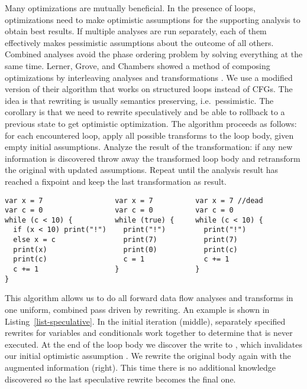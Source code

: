 Many optimizations are mutually beneficial.  In the presence of loops,
optimizations need to make optimistic assumptions for the supporting analysis
to obtain best results.  If multiple analyses are run separately, each of them
effectively makes pessimistic assumptions about the outcome of all others.
Combined analyses avoid the phase ordering problem by solving everything at the
same time. Lerner, Grove, and Chambers showed a method of composing
optimizations by interleaving analyses and transformations
\cite{lerner02composingdataflow}.  We use a modified version of their algorithm that
works on structured loops instead of CFGs. The idea is that rewriting is
usually semantics preserving, i.e.\ pessimistic.  The corollary is that we need
to rewrite speculatively and be able to rollback to a previous state to get
optimistic optimization. The algorithm proceeds as follows: for each
encountered loop, apply all possible transforms to the loop body, given empty
initial assumptions.  Analyze the result of the transformation: if any new
information is discovered throw away the transformed loop body and retransform
the original with updated assumptions.  Repeat until the analysis result has
reached a fixpoint and keep the last transformation as result.


\begin{lstlisting}[name=Code, caption={Speculative rewriting: initial optimistic
iteration (middle), fixpoint (right) reached after second iteration}, captionpos=b, 
label=list-speculative, float=t]
var x = 7                 var x = 7          var x = 7 //dead
var c = 0                 var c = 0          var c = 0
while (c < 10) {          while (true) {     while (c < 10) {
  if (x < 10) print("!")    print("!")         print("!")
  else x = c                print(7)           print(7)
  print(x)                  print(0)           print(c)
  print(c)                  c = 1              c += 1
  c += 1                  }                  }
}
\end{lstlisting}
This algorithm allows us to do all forward data flow analyses and transforms in
one uniform, combined pass driven by rewriting. An example is shown in
Listing~\ref{list-speculative}.  In the initial iteration (middle), separately
specified rewrites for variables and conditionals work together to 
determine that  is never executed. At the end of the loop body we
discover the write to , which invalidates our initial optimistic
assumption .  We rewrite the original body again with the augmented
information (right).  This time there is no additional knowledge discovered so
the last speculative rewrite becomes the final one.  




